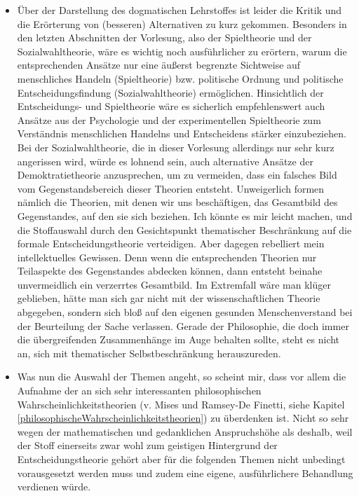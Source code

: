 \begin{itemize}
  \item Über der Darstellung des dogmatischen Lehrstoffes ist leider die Kritik
  und die Erörterung von (besseren) Alternativen zu kurz gekommen. Besonders in
  den letzten Abschnitten der Vorlesung, also der Spieltheorie und der
  Sozialwahltheorie, wäre es wichtig noch ausführlicher zu erörtern, warum die
  entsprechenden Ansätze nur eine äußerst begrenzte Sichtweise auf menschliches
  Handeln (Spieltheorie) bzw. politische Ordnung und politische
  Entscheidungsfindung (Sozialwahltheorie) ermöglichen. Hinsichtlich der
  Entscheidungs- und Spieltheorie wäre es sicherlich empfehlenswert auch
  Ansätze aus der Psychologie und der experimentellen Spieltheorie zum
  Verständnis menschlichen Handelns und Entscheidens stärker einzubeziehen. 
  Bei der Sozialwahltheorie, die in dieser
  Vorlesung allerdings nur sehr kurz angerissen wird, würde es lohnend sein, 
  auch alternative Ansätze der Demoktratietheorie anzusprechen, 
  um zu vermeiden, dass ein falsches Bild vom Gegenstandsbereich dieser
  Theorien entsteht. Unweigerlich formen nämlich die Theorien, mit denen wir
  uns beschäftigen, das Gesamtbild des Gegenstandes, auf den sie sich beziehen.
  Ich könnte es mir leicht machen, und die Stoffauswahl durch den Gesichtspunkt
  thematischer Beschränkung auf die formale Entscheidungstheorie verteidigen.
  Aber dagegen rebelliert mein intellektuelles Gewissen. Denn
  wenn die entsprechenden Theorien nur Teilaspekte des Gegenstandes
  abdecken können, dann entsteht beinahe unvermeidlich ein verzerrtes 
  Gesamtbild. Im Extremfall wäre man klüger geblieben, 
  hätte man sich
  gar nicht mit der wissenschaftlichen Theorie abgegeben, sondern sich bloß auf
  den eigenen gesunden Menschenverstand bei der Beurteilung der Sache verlassen. 
  Gerade der Philosophie, die doch immer die übergreifenden Zusammenhänge im
  Auge behalten sollte, steht es nicht an, sich mit thematischer
  Selbstbeschränkung herauszureden.

  \item Was nun die Auswahl der Themen angeht, so scheint mir, dass vor allem
  die Aufnahme der an sich sehr interessanten philosophischen
  Wahrscheinlichkeitstheorien (v. Mises und Ramsey-De Finetti, siehe Kapitel
  \ref{philosophischeWahrscheinlichkeitstheorien}) zu überdenken ist. Nicht so
  sehr wegen der mathematischen und gedanklichen Anspruchshöhe als deshalb,
  weil der Stoff einerseits zwar wohl zum geistigen Hintergrund der
  Entscheidungstheorie gehört aber für die folgenden Themen nicht unbedingt
  vorausgesetzt werden muss und zudem eine eigene, ausführlichere Behandlung
  verdienen würde. 
  

\end{itemize}
